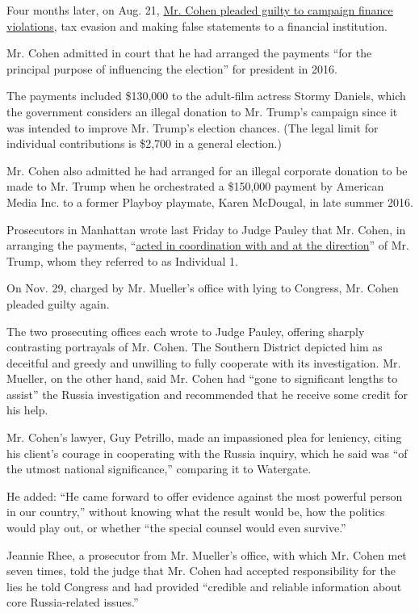 Four months later, on Aug. 21,
\href{https://www.nytimes3xbfgragh.onion/2018/08/21/nyregion/michael-cohen-plea-deal-trump.html}{Mr.
Cohen pleaded guilty to campaign finance violations}, tax evasion and
making false statements to a financial institution.

Mr. Cohen admitted in court that he had arranged the payments ``for the
principal purpose of influencing the election'' for president in 2016.

The payments included \$130,000 to the adult-film actress Stormy
Daniels, which the government considers an illegal donation to Mr.
Trump's campaign since it was intended to improve Mr. Trump's election
chances. (The legal limit for individual contributions is \$2,700 in a
general election.)

Mr. Cohen also admitted he had arranged for an illegal corporate
donation to be made to Mr. Trump when he orchestrated a \$150,000
payment by American Media Inc. to a former Playboy playmate, Karen
McDougal, in late summer 2016.

Prosecutors in Manhattan wrote last Friday to Judge Pauley that Mr.
Cohen, in arranging the payments,
``\href{https://www.nytimes3xbfgragh.onion/2018/12/07/nyregion/michael-cohen-sentence.html}{acted
in coordination with and at the direction}'' of Mr. Trump, whom they
referred to as Individual 1.

On Nov. 29, charged by Mr. Mueller's office with lying to Congress, Mr.
Cohen pleaded guilty again.

The two prosecuting offices each wrote to Judge Pauley, offering sharply
contrasting portrayals of Mr. Cohen. The Southern District depicted him
as deceitful and greedy and unwilling to fully cooperate with its
investigation. Mr. Mueller, on the other hand, said Mr. Cohen had ``gone
to significant lengths to assist'' the Russia investigation and
recommended that he receive some credit for his help.

Mr. Cohen's lawyer, Guy Petrillo, made an impassioned plea for leniency,
citing his client's courage in cooperating with the Russia inquiry,
which he said was ``of the utmost national significance,'' comparing it
to Watergate.

He added: ``He came forward to offer evidence against the most powerful
person in our country,'' without knowing what the result would be, how
the politics would play out, or whether ``the special counsel would even
survive.''

Jeannie Rhee, a prosecutor from Mr. Mueller's office, with which Mr.
Cohen met seven times, told the judge that Mr. Cohen had accepted
responsibility for the lies he told Congress and had provided ``credible
and reliable information about core Russia-related issues.''

